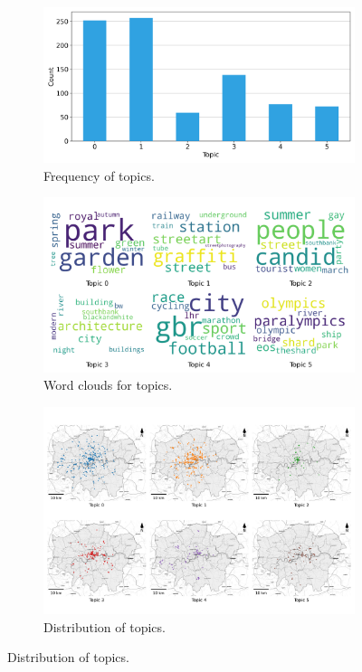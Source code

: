 \documentclass{article}
\theoremstyle{remark}
\begin{document}
\begin{figure}[!h]
    \centering
    \begin{subfigure}{0.45\textwidth}
        \centering
        \includegraphics[width=\linewidth]{figures/places_sense_weekend_locals.png} 
        \caption{Frequency of topics.}
        \label{fig:places_sense_weekend_locals}
    \end{subfigure}
    \hfill
    \begin{subfigure}{0.5\textwidth}
        \centering
        \includegraphics[width=\linewidth]{figures/topics_weekend_locals.png} 
        \caption{Word clouds for topics.}
        \label{fig:topics_weekend_locals}
    \end{subfigure}
    
    \begin{subfigure}{0.9\textwidth}
        \centering
        \includegraphics[width=\linewidth]{figures/topics_distribution_weekend_locals.png} 
        \caption{Distribution of topics.}
        \label{fig:topics_distribution_weekend_locals}
    \end{subfigure}


\end{figure}
\end{document}
